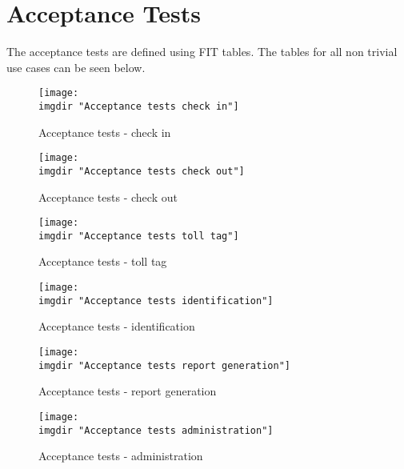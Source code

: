 \chapter{Acceptance Tests}
The acceptance tests are defined using FIT tables. The tables for all non trivial use cases can be seen below.

\begin{figure}[H]
\texttt{[image: \\imgdir "Acceptance tests check in"]}
\centering
\caption{Acceptance tests - check in}
\label{fig:acceptance_tests_check_in}
\end{figure}

\begin{figure}[H]
\texttt{[image: \\imgdir "Acceptance tests check out"]}
\centering
\caption{Acceptance tests - check out}
\label{fig:acceptance_tests_check_out}
\end{figure}

\begin{figure}[H]
\texttt{[image: \\imgdir "Acceptance tests toll tag"]}
\centering
\caption{Acceptance tests - toll tag}
\label{fig:acceptance_tests_toll_tag}
\end{figure}

\begin{figure}[H]
\texttt{[image: \\imgdir "Acceptance tests identification"]}
\centering
\caption{Acceptance tests - identification}
\label{fig:acceptance_tests_identification}
\end{figure}

\begin{figure}[H]
\texttt{[image: \\imgdir "Acceptance tests report generation"]}
\centering
\caption{Acceptance tests - report generation}
\label{fig:acceptance_tests_report_generation}
\end{figure}

\begin{figure}[H]
\texttt{[image: \\imgdir "Acceptance tests administration"]}
\centering
\caption{Acceptance tests - administration}
\label{fig:acceptance_tests_administration}
\end{figure}